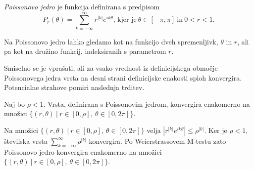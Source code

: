 \documentclass[mat1, tisk]{fmfdelo}
\begin{document}
    \begin{definicija}
        \emph{Poissonovo jedro} je funkcija definirana s predpisom
        $$
           P_r(\theta) = \sum_{k = -\infty}^{\infty}{r^{|k|} e^{i k \theta}}\text{, kjer je}~\theta \in [-\pi, \pi]~\text{in}~ 0 < r < 1.
        $$
    \end{definicija}
    \begin{opomba}
        Na Poissonovo jedro lahko gledamo kot na funkcijo dveh spremenljivk, $\theta$ in $r$, ali pa kot na družino funkcij, indeksiranih s parametrom $r$.
    \end{opomba}

    Smiselno se je vprašati, ali za vsako vrednost iz definicijskega območje Poissonovega jedra vrsta na desni strani definicijske enakosti sploh konvergira. Potencialne strahove pomiri naslednja trditev.
    
    \begin{trditev}
        Naj bo $\rho < 1$. Vrsta, definirana s Poissonovim jedrom, konvergira enakomerno na množici $\{(r,\theta)~|~r \in [0,\rho],~ \theta \in [0,2\pi]\}$.
    \end{trditev}
    \begin{dokaz}
        Na množici $\{(r,\theta)~|~r \in [0,\rho],~ \theta \in [0,2\pi]\}$ velja $|r^{|k|} e^{i k \theta}| \leq \rho^{|k|}$. Ker je $\rho < 1$, številska vrsta $\sum_{k = -\infty}^{\infty}{\rho ^{|k|}}$ konvergira. 
        Po Weierstrassovem M-testu zato Poissonovo jedro konvergira enakomerno na množici $\{(r,\theta)~|~r \in [0,\rho],~ \theta \in [0,2\pi]\}$.
    \end{dokaz}
\end{document}

